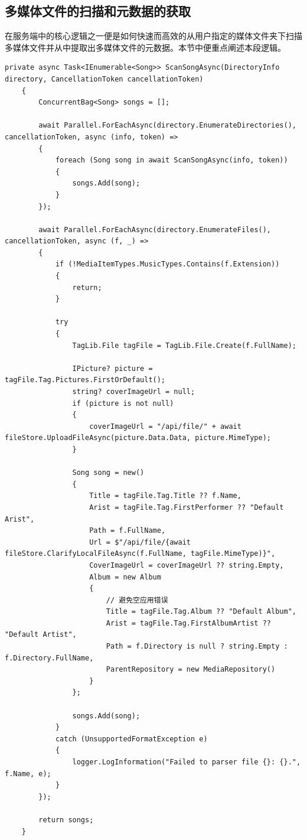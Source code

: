 \documentclass[main.tex]{subfiles}
\begin{document}
\subsection{多媒体文件的扫描和元数据的获取}

在服务端中的核心逻辑之一便是如何快速而高效的从用户指定的媒体文件夹下扫描多媒体文件并从中提取出多媒体文件的元数据。本节中便重点阐述本段逻辑。

\begin{lstlisting}[style=csharp]
    private async Task<IEnumerable<Song>> ScanSongAsync(DirectoryInfo directory, CancellationToken cancellationToken)
    {
        ConcurrentBag<Song> songs = [];

        await Parallel.ForEachAsync(directory.EnumerateDirectories(), cancellationToken, async (info, token) =>
        {
            foreach (Song song in await ScanSongAsync(info, token))
            {
                songs.Add(song);
            }
        });

        await Parallel.ForEachAsync(directory.EnumerateFiles(), cancellationToken, async (f, _) =>
        {
            if (!MediaItemTypes.MusicTypes.Contains(f.Extension))
            {
                return;
            }

            try
            {
                TagLib.File tagFile = TagLib.File.Create(f.FullName);

                IPicture? picture = tagFile.Tag.Pictures.FirstOrDefault();
                string? coverImageUrl = null;
                if (picture is not null)
                {
                    coverImageUrl = "/api/file/" + await fileStore.UploadFileAsync(picture.Data.Data, picture.MimeType);
                }

                Song song = new()
                {
                    Title = tagFile.Tag.Title ?? f.Name,
                    Arist = tagFile.Tag.FirstPerformer ?? "Default Arist",
                    Path = f.FullName,
                    Url = $"/api/file/{await fileStore.ClarifyLocalFileAsync(f.FullName, tagFile.MimeType)}",
                    CoverImageUrl = coverImageUrl ?? string.Empty,
                    Album = new Album
                    {
                        // 避免空应用错误
                        Title = tagFile.Tag.Album ?? "Default Album",
                        Arist = tagFile.Tag.FirstAlbumArtist ?? "Default Artist",
                        Path = f.Directory is null ? string.Empty : f.Directory.FullName,
                        ParentRepository = new MediaRepository()
                    }
                };

                songs.Add(song);
            }
            catch (UnsupportedFormatException e)
            {
                logger.LogInformation("Failed to parser file {}: {}.", f.Name, e);
            }
        });

        return songs;
    }
\end{lstlisting}
\end{document}
